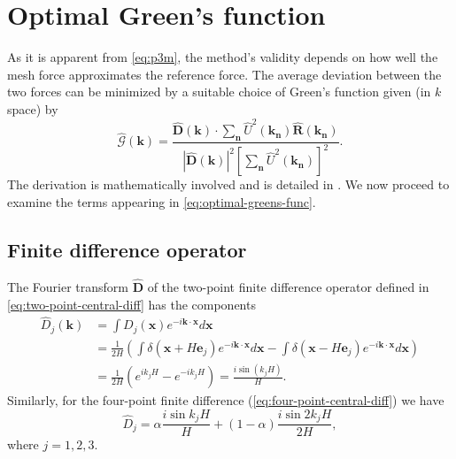 \section{Optimal Green's function}
As it is apparent from \autoref{eq:p3m}, the method's validity depends on how well the mesh force approximates the reference force.
The average deviation between the two forces can be minimized by a suitable choice of Green's function given (in $k$ space) by
\begin{equation}\label{eq:optimal-greens-func}
    \hat{\mathcal{G}}(\mathbf{k}) = \frac{\mathbf{\hat{D}}(\mathbf{k}) \cdot \sum_{\mathbf{n}}\hat{U}^2(\mathbf{k_\mathbf{n}}) \mathbf{\hat{R}}(\mathbf{k}_\mathbf{n})}{|\mathbf{\hat{D}}(\mathbf{k})|^2 \left[ \sum_{\mathbf{n}}\hat{U}^2(\mathbf{k}_\mathbf{n}) \right]^2}.
\end{equation}
The derivation is mathematically involved and is detailed in \cite{Hockney1988}.
We now proceed to examine the terms appearing in \autoref{eq:optimal-greens-func}.

\subsection{Finite difference operator}
The Fourier transform $\mathbf{\hat{D}}$ of the two-point finite difference operator defined in \autoref{eq:two-point-central-diff} has the components
\begin{align*}
    \hat{D}_j(\mathbf{k})
     & = \int D_j(\mathbf{x}) e^{-i\mathbf{k}\cdot \mathbf{x}} d\mathbf{x}                                                                                                                                      \\
     & = \frac{1}{2H}\left( \int \delta(\mathbf{x} + H\mathbf{e}_j)e^{-i \mathbf{k}\cdot \mathbf{x}} d\mathbf{x} - \int \delta(\mathbf{x} - H\mathbf{e}_j)e^{-i \mathbf{k}\cdot \mathbf{x}} d\mathbf{x} \right) \\
     & = \frac{1}{2H} (e^{ik_j H} - e^{-ik_j H})
    = \frac{i \sin(k_j H)}{H}.
\end{align*}
Similarly, for the four-point finite difference (\autoref{eq:four-point-central-diff}) we have
\begin{equation*}
    \hat{D}_j = \alpha\frac{i\sin k_j H}{H} + (1- \alpha)\frac{i\sin 2k_j H}{2H},
\end{equation*}
where $j=1,2,3$.

